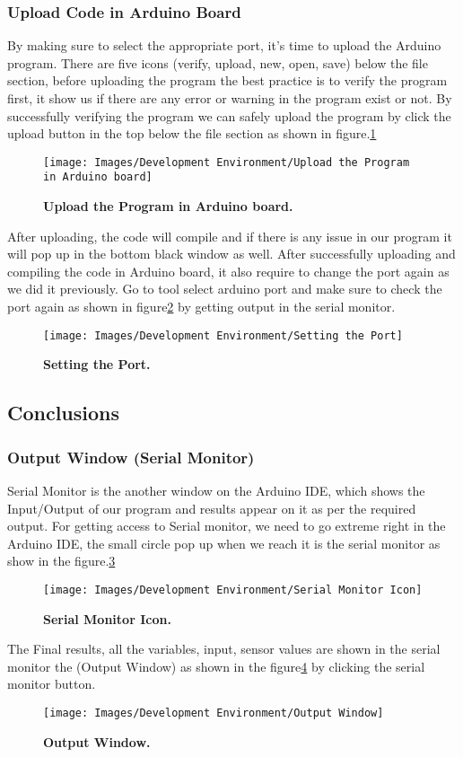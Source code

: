 \subsubsection{Upload Code in Arduino Board}\label{uploadcode}
By making sure to select the appropriate port, it’s time to upload the Arduino program.
There are five icons (verify, upload, new, open, save) below the file section, before
uploading the program the best practice is to verify the program first, it show us if
there are any error or warning in the program exist or not. By successfully verifying
the program we can safely upload the program by click the upload button in the top
below the file section as shown in figure.\ref{fig:Upload the Program in Arduino board}
\begin{figure}[H]\centering
	\texttt{[image: Images/Development Environment/Upload the Program in Arduino board]}
	\caption{\textbf{Upload the Program in Arduino board.}}
	\label{fig:Upload the Program in Arduino board}		
\end{figure}
After uploading, the code will compile and if there is any issue in our program it will
pop up in the bottom black window as well.
After successfully uploading and compiling the code in Arduino board, it also require
to change the port again as we did it previously. Go to tool select arduino port and
make sure to check the port again as shown in figure\ref{fig:Setting the Port} by getting output in the
serial monitor.
\begin{figure}[H]\centering
	\texttt{[image: Images/Development Environment/Setting the Port]}
	\caption{\textbf{Setting the Port.}}
	\label{fig:Setting the Port}		
\end{figure} 
\subsection{Conclusions}
\subsubsection{Output Window (Serial Monitor)}
Serial Monitor is the another window on the Arduino IDE, which shows the Input/Output of our program and results appear on it as per the required output. For getting
access to Serial monitor, we need to go extreme right in the Arduino IDE, the small
circle pop up when we reach it is the serial monitor as show in the figure.\ref{fig:Serial Monitor Icon}
\begin{figure}[H]\centering
	\texttt{[image: Images/Development Environment/Serial Monitor Icon]}
	\caption{\textbf{Serial Monitor Icon.}}
	\label{fig:Serial Monitor Icon}		
\end{figure} 
The Final results, all the variables, input, sensor values are shown in the serial monitor
the (Output Window) as shown in the figure\ref{fig:Output Window} by clicking the serial monitor button.
\begin{figure}[H]\centering
	\texttt{[image: Images/Development Environment/Output Window]}
	\caption{\textbf{Output Window.}}
	\label{fig:Output Window}		
\end{figure} 


